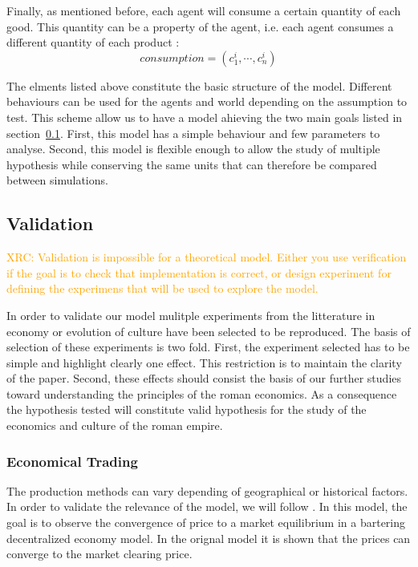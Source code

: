 \documentclass{wscpaperproc}
\newcommand{\memo}[2]{\textcolor{#1}{#2}}
\newcommand{\xrc}[1]{\memo{orange}{XRC: #1\\}}
\begin{document}
Finally, as mentioned before, each agent will consume a certain quantity of each good. This quantity can be a property of the agent, i.e. each agent consumes a different quantity of each product :
$$ consumption = (c^i_1, \cdots, c^i_n) $$ 

The elments listed above constitute the basic structure of the model. Different behaviours can be used for the agents and world depending on the assumption to test. This scheme allow us to have a model ahieving the two main goals listed in section~\ref{}. First, this model has a simple behaviour and few parameters to analyse. Second, this model is flexible enough to allow the study of multiple hypothesis while conserving the same units that can therefore be compared between simulations.


\subsection{Validation}
\xrc{Validation is impossible for a theoretical model. Either you use verification if the goal is to check that implementation is correct, or design experiment for defining the experimens that will be used to explore the model.}

In order to validate our model mulitple experiments from the litterature in economy or evolution of culture have been selected to be reproduced. The basis of selection of these experiments is two fold. First, the experiment selected has to be simple and highlight clearly one effect. This restriction is to maintain the clarity of the paper. Second, these effects should consist the basis of our further studies toward understanding the principles of the roman economics. As a consequence the hypothesis tested will constitute valid hypothesis for the study of the economics and culture of the roman empire.

\subsubsection{Economical Trading}\label{trade}

The production methods can vary depending of geographical or historical factors. In order to validate the relevance of the model, we will follow \cite{gintis_emergence_2006}. In this model, the goal is to observe the convergence of price to a market equilibrium in a bartering decentralized economy model. In the orignal model it is shown that the prices can converge to the market clearing price.
\end{document}
